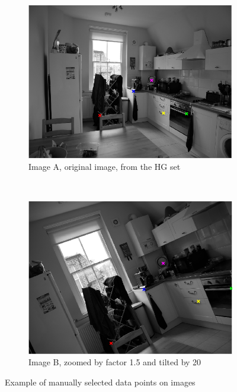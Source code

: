 \documentclass[a4paper, 10pt, conference]{ieeeconf}
\begin{document}
\begin{figure}[!ht]
  \captionsetup[subfigure]{position=b}
  \centering
    \begin{subfigure}{0.45\linewidth}
      \includegraphics[width=\textwidth]{pic/manualA}
      \caption{Image A, original image, from the HG set}
      \label{fig:manualA}
    \end{subfigure}
    ~
    \begin{subfigure}{0.45\linewidth}
      \includegraphics[width=\textwidth]{pic/manualB}
      \caption{Image B, zoomed by factor 1.5 and tilted by 20\degree}
      \label{fig:manualB}
    \end{subfigure}

	\caption{Example of manually selected data points on images}
  \label{fig:manual}
\end{figure}
\end{document}
